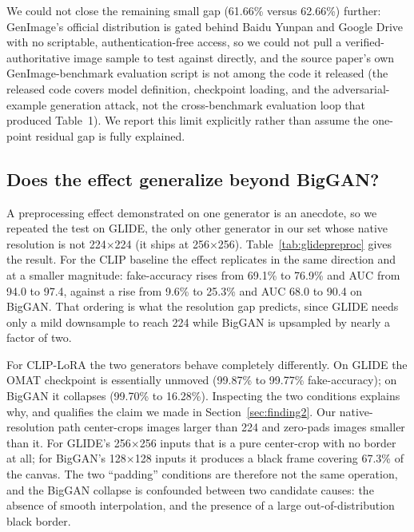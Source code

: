 \documentclass[3p,times,procedia]{elsarticle}
\begin{document}
We could not close the remaining small gap (61.66\% versus 62.66\%)
further: GenImage's official distribution is gated behind Baidu Yunpan
and Google Drive with no scriptable, authentication-free access, so we
could not pull a verified-authoritative image sample to test against
directly, and the source paper's own GenImage-benchmark evaluation script
is not among the code it released (the released code covers model
definition, checkpoint loading, and the adversarial-example generation
attack, not the cross-benchmark evaluation loop that produced Table~1).
We report this limit explicitly rather than assume the one-point residual
gap is fully explained.

\subsection{Does the effect generalize beyond BigGAN?}
\label{sec:glide-preproc}

A preprocessing effect demonstrated on one generator is an anecdote, so we
repeated the test on GLIDE, the only other generator in our set whose native
resolution is not 224$\times$224 (it ships at 256$\times$256).
Table~\ref{tab:glidepreproc} gives the result. For the CLIP baseline the
effect replicates in the same direction and at a smaller magnitude:
fake-accuracy rises from 69.1\% to 76.9\% and AUC from 94.0 to 97.4,
against a rise from 9.6\% to 25.3\% and AUC 68.0 to 90.4 on BigGAN. That
ordering is what the resolution gap predicts, since GLIDE needs only a mild
downsample to reach 224 while BigGAN is upsampled by nearly a factor of two.

For CLIP-LoRA the two generators behave completely differently. On GLIDE the
OMAT checkpoint is essentially unmoved (99.87\% to 99.77\% fake-accuracy);
on BigGAN it collapses (99.70\% to 16.28\%). Inspecting the two conditions
explains why, and qualifies the claim we made in
Section~\ref{sec:finding2}. Our native-resolution path center-crops images
larger than 224 and zero-pads images smaller than it. For GLIDE's
256$\times$256 inputs that is a pure center-crop with no border at all; for
BigGAN's 128$\times$128 inputs it produces a black frame covering 67.3\% of
the canvas. The two ``padding'' conditions are therefore not the same
operation, and the BigGAN collapse is confounded between two candidate
causes: the absence of smooth interpolation, and the presence of a large
out-of-distribution black border.
\end{document}
